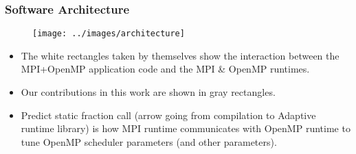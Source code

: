 \begin{frame}
\frametitle{Software Architecture}
\begin{figure}
\begin{center}
\label{code:architecture}
\texttt{[image: ../images/architecture]}
\end{center}
\end{figure} 

\begin{itemize}
\tiny \item \tiny The white rectangles taken by themselves show the
interaction between the MPI+OpenMP application code and the
MPI \& OpenMP runtimes.  
\item \tiny Our contributions in this work are shown in gray
  rectangles. %
\item \tiny Predict static fraction call (arrow going from compilation
  to Adaptive runtime library) is how MPI runtime
  communicates with OpenMP runtime to tune OpenMP scheduler parameters
  (and other parameters). 
\end{itemize}
\end{frame}

